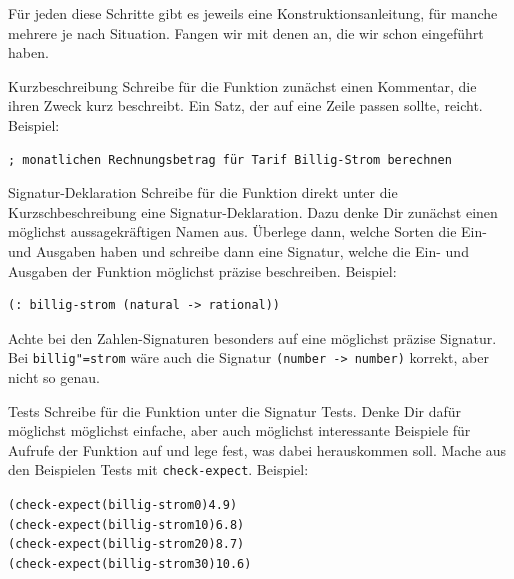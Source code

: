 Für jeden diese Schritte gibt es jeweils eine Konstruktionsanleitung,
für manche mehrere je nach Situation.  Fangen wir mit denen an, die
wir schon eingeführt haben.

\begin{konstruktionsanleitung}{Kurzbeschreibung}
  \label{ka:kurzbeschreibung}
  Schreibe für die Funktion zunächst einen Kommentar, die ihren Zweck
  kurz beschreibt.  Ein Satz, der auf eine Zeile passen sollte,
  reicht.  Beispiel:
\begin{verbatim}
; monatlichen Rechnungsbetrag für Tarif Billig-Strom berechnen
\end{verbatim}
\end{konstruktionsanleitung}

\begin{konstruktionsanleitung}{Signatur-Deklaration}
  \label{ka:signatur-deklaration}
  Schreibe für die Funktion direkt unter die Kurzschbeschreibung eine
  Signatur-Deklaration.  Dazu denke Dir zunächst einen möglichst
  aussagekräftigen Namen aus.  Überlege dann, welche Sorten die Ein-
  und Ausgaben haben und schreibe dann eine Signatur, welche die Ein-
  und Ausgaben der Funktion möglichst präzise beschreiben.  Beispiel:
  \begin{verbatim}
(: billig-strom (natural -> rational))
\end{verbatim}
  Achte bei den Zahlen-Signaturen besonders auf eine möglichst präzise
  Signatur.  Bei \texttt{billig"=strom} wäre auch die Signatur
  \texttt{(number -> number)} korrekt, aber nicht so genau.
\end{konstruktionsanleitung}

\begin{konstruktionsanleitung}{Tests}
  \label{ka:tests}
  Schreibe für die Funktion unter die Signatur Tests.  Denke Dir dafür
  möglichst möglichst einfache, aber auch möglichst interessante
  Beispiele für Aufrufe der Funktion auf und lege fest, was dabei
  herauskommen soll.  Mache aus den Beispielen Tests mit
  \texttt{check-expect}.  Beispiel:
\begin{alltt}
(check-expect (billig-strom 0) 4.9)
(check-expect (billig-strom 10) 6.8)
(check-expect (billig-strom 20) 8.7)
(check-expect (billig-strom 30) 10.6)
\end{alltt}
\end{konstruktionsanleitung}

